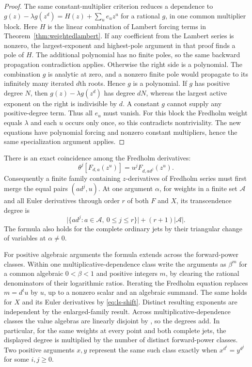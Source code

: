 \documentclass[11pt,a4paper]{article}
\theoremstyle{definition}
\theoremstyle{remark}
\numberwithin{equation}{section}
\begin{document}
\begin{proof}
The same constant-multiplier criterion reduces a dependence to
$g(z)-\lambda g(z^d)=H(z)+\sum_u e_u z^u$ for a rational $g$, in
one common multiplier block. Here $H$ is the linear combination of
Lambert forcing terms in Theorem~\ref{thm:weightedlambert}.
If any coefficient from the Lambert series is nonzero, the
largest-exponent and highest-pole argument in that proof finds a pole
of $H$. The additional polynomial has no finite poles, so the same
backward propagation contradiction applies. Otherwise the right side
is a polynomial. The combination $g$ is analytic at zero, and a
nonzero finite pole would propagate to its infinitely many iterated
$d$th roots. Hence $g$ is a polynomial. If $g$ has positive degree
$N$, then $g(z)-\lambda g(z^d)$ has degree $dN$, whereas the largest
active exponent on the right is indivisible by $d$. A constant $g$
cannot supply any positive-degree term. Thus all $e_u$ must vanish.
For this block the Fredholm weight equals $\lambda$ and each $u$
occurs only once, so this contradicts nontriviality. The new equations
have polynomial forcing and nonzero constant multipliers, hence the
same specialization argument applies.
\end{proof}

There is an exact coincidence among the Fredholm derivatives:
\[
 \theta^j[F_{d,a}(z^u)]=u^j F_{d,ad^j}(z^u).
\]
Consequently a finite family containing $z$-derivatives of Fredholm
series must first merge the equal pairs $(ad^j,u)$. At one argument
$\alpha$, for weights in a finite set $\mathcal A$ and all Euler
derivatives through order $r$ of both $F$ and $X$, its transcendence
degree is
\[
  \bigl|\{ad^j:a\in\mathcal A,\ 0\le j\le r\}\bigr|
       +(r+1)|\mathcal A|.
\]
The formula also holds for the complete ordinary jets by their
triangular change of variables at $\alpha\ne0$.

For positive algebraic arguments the formula extends across the
forward-power classes. Within one multiplicative-dependence class
write the arguments as $\beta^m$ for a common algebraic
$0<\beta<1$ and positive integers $m$, by clearing the rational
denominators of their logarithmic ratios. Iterating the Fredholm
equation replaces $m=d^t u$ by $u$, up to a nonzero scalar and an
algebraic summand. The same holds for $X$ and its Euler derivatives
by \eqref{eq:ls-shift}. Distinct resulting exponents are independent
by the enlarged-family result. Across multiplicative-dependence
classes the value algebras are linearly disjoint by
\cite[Theorem~1.1]{AFdisjoint}, so the degrees add. In particular,
for the same weights at every point and both complete jets, the
displayed degree is multiplied by the number of distinct
forward-power classes. Two positive arguments $x,y$ represent the
same such class exactly when $x^{d^i}=y^{d^j}$ for some $i,j\ge0$.
\end{document}
